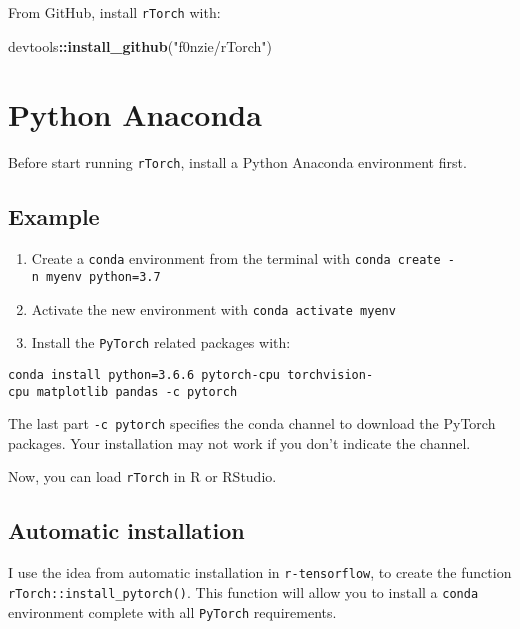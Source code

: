 \documentclass[]{book}
\newenvironment{Shaded}{\begin{snugshade}}{\end{snugshade}}
\newcommand{\KeywordTok}[1]{\textcolor[rgb]{0.13,0.29,0.53}{\textbf{#1}}}
\newcommand{\NormalTok}[1]{#1}
\newcommand{\OperatorTok}[1]{\textcolor[rgb]{0.81,0.36,0.00}{\textbf{#1}}}
\newcommand{\StringTok}[1]{\textcolor[rgb]{0.31,0.60,0.02}{#1}}
\begin{document}
From GitHub, install \texttt{rTorch} with:

\begin{Shaded}
\begin{Highlighting}[]
\NormalTok{devtools}\OperatorTok{::}\KeywordTok{install_github}\NormalTok{(}\StringTok{"f0nzie/rTorch"}\NormalTok{)}
\end{Highlighting}
\end{Shaded}

\hypertarget{python-anaconda}{%
\section*{Python Anaconda}\label{python-anaconda}}

Before start running \texttt{rTorch}, install a Python Anaconda environment first.

\hypertarget{example}{%
\subsection*{Example}\label{example}}

\begin{enumerate}
\def\labelenumi{\arabic{enumi}.}
\item
  Create a \texttt{conda} environment from the terminal with \texttt{conda\ create\ -n\ myenv\ python=3.7}
\item
  Activate the new environment with \texttt{conda\ activate\ myenv}
\item
  Install the \texttt{PyTorch} related packages with:
\end{enumerate}

\texttt{conda\ install\ python=3.6.6\ pytorch-cpu\ torchvision-cpu\ matplotlib\ pandas\ -c\ pytorch}

The last part \texttt{-c\ pytorch} specifies the conda channel to download the PyTorch packages. Your installation may not work if you don't indicate the channel.

Now, you can load \texttt{rTorch} in R or RStudio.

\hypertarget{automatic-installation}{%
\subsection*{Automatic installation}\label{automatic-installation}}

I use the idea from automatic installation in \texttt{r-tensorflow}, to create the function \texttt{rTorch::install\_pytorch()}. This function will allow you to install a \texttt{conda} environment complete with all \texttt{PyTorch} requirements.
\end{document}
